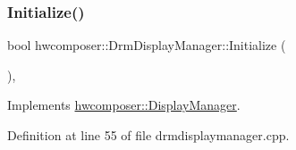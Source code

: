 \subsubsection{\texorpdfstring{Initialize()}{Initialize()}}
{\footnotesize\ttfamily bool hwcomposer\+::\+Drm\+Display\+Manager\+::\+Initialize (\begin{DoxyParamCaption}{ }\end{DoxyParamCaption})\hspace{0.3cm}{\ttfamily [override]}, {\ttfamily [virtual]}}



Implements \mbox{\hyperlink{classhwcomposer_1_1DisplayManager_abb67b1deed55bf20584f86aea2ae5167}{hwcomposer\+::\+Display\+Manager}}.



Definition at line 55 of file drmdisplaymanager.\+cpp.



